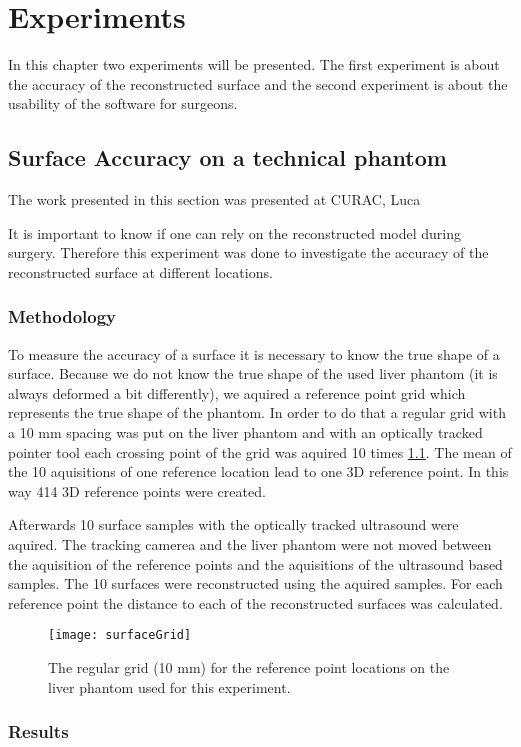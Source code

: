 \chapter{Experiments}
In this chapter two experiments will be presented. The first experiment is about
the accuracy of the reconstructed surface and the second experiment is about the
usability of the software for surgeons.
\section{Surface Accuracy on a technical phantom}
\label{sec:SurfaceReconstructionAccuracy}
The work presented in this section was presented at CURAC, Luca

 It is important to know if one can rely on the reconstructed model
during surgery. Therefore this experiment was done to investigate the accuracy of the reconstructed
surface at different locations.
\subsection{Methodology}
To measure the accuracy of a surface it is necessary to know the true shape of a
surface. Because we do not know the true shape of the used liver phantom (it is
always deformed a bit differently), we aquired a reference point grid which
represents the true shape of the phantom. In order
to do that a regular grid with a 10 mm spacing was put on the liver phantom and
with an optically tracked pointer tool each crossing point of the grid was
aquired 10 times \ref{fig:surfaceGrid}. The mean of the 10 aquisitions of one reference location lead
to one 3D reference point. In this way 414 3D reference points were created.

Afterwards 10 surface samples with the optically tracked ultrasound were
aquired. The tracking camerea and the liver phantom were not moved between the
aquisition of the reference points and the aquisitions of the ultrasound based
samples. The 10 surfaces were reconstructed using the aquired samples. For each
reference point the distance to each of the reconstructed surfaces was
calculated.

\begin{figure}[H]
  \centering
 \texttt{[image: surfaceGrid]}
 \caption{The regular grid (10 mm) for the reference point locations on the liver
   phantom used for this experiment.}
  \label{fig:surfaceGrid}
\end{figure}
\subsection{Results}

